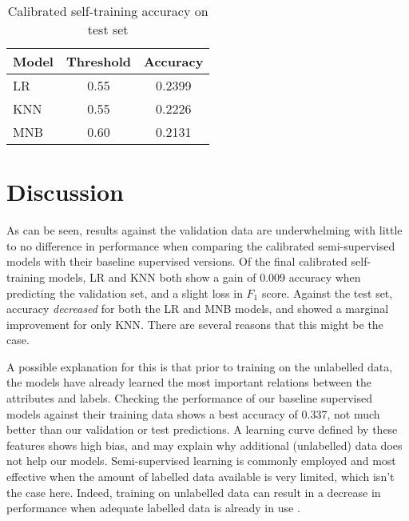 \documentclass[11pt]{article}
\begin{document}
\begin{table}[h]
 \begin{center}
\begin{tabular}{|l||c|c|}

      \hline
      \textbf{Model} & \textbf{Threshold} & \textbf{Accuracy}\\
      \hline\hline
      LR & 0.55 & 0.2399\\
	\hline
      KNN & 0.55 & 0.2226\\
	\hline
      MNB & 0.60 & 0.2131\\
      \hline

\end{tabular}
\caption{Calibrated self-training accuracy on test set}
\label{table:cal self test}
\end{center}
\end{table}

\section{Discussion}

As can be seen, results against the validation data are underwhelming with little to no difference in 
performance when comparing the calibrated semi-supervised models with their baseline supervised versions. 
Of the final calibrated self-training models, LR and KNN both show a gain of 0.009 accuracy when predicting the validation set, and a slight loss in $F_1$ score. Against the test set, accuracy \textit{decreased} for both the LR and MNB models, and showed a marginal improvement for only KNN.
There are several reasons that this might be the case.

A possible explanation for this is that prior to training on the unlabelled data, the models have 
already learned the most important relations between the attributes and labels. Checking the performance 
of our baseline supervised models against their training data shows a best accuracy of 0.337, 
not much better than our validation or test predictions. A learning curve defined by 
these features shows high bias, and may explain why additional (unlabelled) data does not help our models.
Semi-supervised learning is commonly employed and most effective when the amount of labelled data available is 
very limited, which isn't the case here. Indeed, training on unlabelled data can result in a decrease in 
performance when adequate labelled data is already in use \citep{Chapelle2006}.
\end{document}
